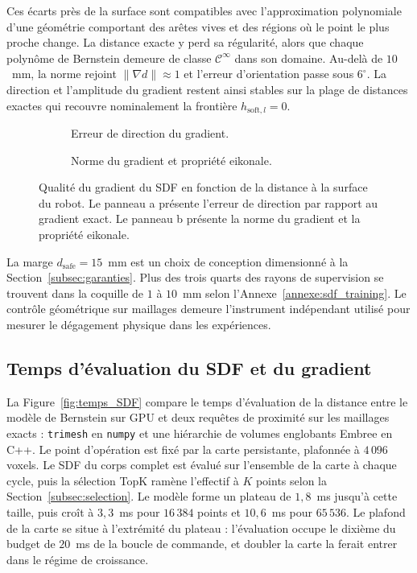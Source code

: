 Ces écarts près de la surface sont compatibles avec l'approximation polynomiale d'une géométrie comportant des arêtes vives et des régions où le point le plus proche change. La distance exacte y perd sa régularité, alors que chaque polynôme de Bernstein demeure de classe $\mathcal{C}^\infty$ dans son domaine. Au-delà de $10$~mm, la norme rejoint $\|\nabla d\|\approx1$ et l'erreur d'orientation passe sous $6^\circ$. La direction et l'amplitude du gradient restent ainsi stables sur la plage de distances exactes qui recouvre nominalement la frontière $h_{\mathrm{soft},l}=0$.

\begin{figure}[!htbp]
    \centering
    \begin{subfigure}[b]{0.48\textwidth}
        \centering
        
        \caption{Erreur de direction du gradient.}\label{fig:gradient_direction}
    \end{subfigure}
    \hfill
    \begin{subfigure}[b]{0.48\textwidth}
        \centering
        
        \caption{Norme du gradient et propriété eikonale.}\label{fig:gradient_norm}
    \end{subfigure}
    \caption[Qualité et propriété eikonale du gradient du SDF]{Qualité du gradient du \ac{SDF} en fonction de la distance à la surface du robot. Le panneau a présente l'erreur de direction par rapport au gradient exact. Le panneau b présente la norme du gradient et la propriété eikonale.}\label{fig:erreur_grad_SDF}
\end{figure}

La marge $d_{\mathrm{safe}} = 15$~mm est un choix de conception dimensionné à la Section~\ref{subsec:garanties}. Plus des trois quarts des rayons de supervision se trouvent dans la coquille de $1$ à $10$~mm selon l'Annexe~\ref{annexe:sdf_training}. Le contrôle géométrique sur maillages demeure l'instrument indépendant utilisé pour mesurer le dégagement physique dans les expériences.

\subsection{Temps d'évaluation du \acs{SDF} et du gradient}\label{subsec:res_sdf_temps}
La Figure~\ref{fig:temps_SDF} compare le temps d'évaluation de la distance entre le modèle de Bernstein sur \ac{GPU} et deux requêtes de proximité sur les maillages exacts : \texttt{trimesh} en \texttt{numpy} et une hiérarchie de volumes englobants Embree en C++. Le point d'opération est fixé par la carte persistante, plafonnée à $4\,096$ voxels. Le \ac{SDF} du corps complet est évalué sur l'ensemble de la carte à chaque cycle, puis la sélection TopK ramène l'effectif à $K$ points selon la Section~\ref{subsec:selection}. Le modèle forme un plateau de $1{,}8$~ms jusqu'à cette taille, puis croît à $3{,}3$~ms pour $16\,384$ points et $10{,}6$~ms pour $65\,536$. Le plafond de la carte se situe à l'extrémité du plateau : l'évaluation occupe le dixième du budget de $20$~ms de la boucle de commande, et doubler la carte la ferait entrer dans le régime de croissance.

